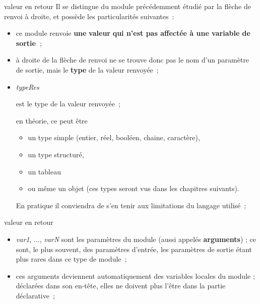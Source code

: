 \begin{frame}{valeur en retour}
	Il se distingue du module précédemment étudié par la flèche de renvoi à
	droite, et possède les particularités suivantes~:

	\begin{itemize}
	\item {
		{ce module renvoie
		}{\textbf{une}}{
		}{\textbf{valeur}}{
		}{\textbf{qui n’est pas affectée à une variable
		de
		}}{\textbf{sortie~}}{;}}
	\item {
		{à droite de la flèche de renvoi ne se trouve
		donc pas le nom d’un paramètre de sortie, mais le
		}{\textbf{type}}{ de la
		valeur renvoyée~;}}
	\item {
		\textit{{typeRes}}{
		est le type de la valeur renvoyée~; 
		
		en théorie, ce peut être 
		\begin{itemize}
		\item
		un type
		simple (entier, réel, booléen, chaine, caractère), 
		\item
		un type structuré,
		\item
		un tableau 
		\item
		ou même un objet (ces types seront vus dans les chapitres 
		suivants). 
		\end{itemize}
		En pratique il conviendra de s’en tenir aux limitations 
		du langage utilisé~;}}
	\end{itemize}
\end{frame}

\begin{frame}{valeur en retour}
	\begin{itemize}
	\item {
		\textit{{var1}}{,
		...,
		}\textit{{varN}}{
		sont les paramètres du module (aussi appelés
		}{\textbf{arguments}}{)
		; ce sont, le plus souvent, des paramètres d’entrée, les paramètres de
		sortie }{étant plus rares dans ce type de
		module~;}}
	\item {
		ces arguments deviennent automatiquement des variables locales du module
		; déclarées dans son en-tête, elles ne doivent plus l’être dans la
		partie déclarative~;}
		\end{itemize}
\end{frame}

